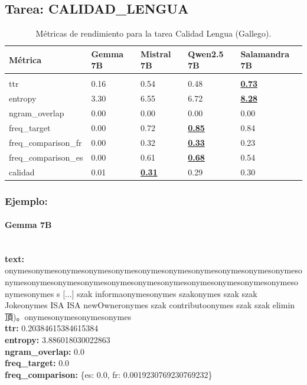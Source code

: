 \subsection{Tarea: CALIDAD\_LENGUA}\label{tarea-calidad_lengua}
\begin{longtable}[]{@{}lllll@{}}
\toprule\noalign{}
Métrica & Gemma 7B & Mistral 7B & Qwen2.5 7B & Salamandra 7B \\
\midrule\noalign{}
\endhead
\bottomrule\noalign{}
\caption{Métricas de rendimiento para la tarea Calidad Lengua (Gallego).}
\label{tab:metricas_calidad_lengua_Gallego}\\
\endlastfoot
ttr & 0.16 & 0.54 & 0.48 & \textbf{\underline{0.73}} \\
entropy & 3.30 & 6.55 & 6.72 & \textbf{\underline{8.28}} \\
ngram\_overlap & 0.00 & 0.00 & 0.00 & 0.00 \\
freq\_target & 0.00 & 0.72 & \textbf{\underline{0.85}} & 0.84 \\
freq\_comparison\_fr & 0.00 & 0.32 & \textbf{\underline{0.33}} & 0.23 \\
freq\_comparison\_es & 0.00 & 0.61 & \textbf{\underline{0.68}} & 0.54 \\
calidad & 0.01 & \textbf{\underline{0.31}} & 0.29 & 0.30 \\
\end{longtable}

\subsubsection{Ejemplo:}

\paragraph{Gemma 7B}~\\
\textbf{text:} onymesonymesonymesonymesonymesonymesonymesonymesonymesonymesonymesonymesonymesonymesonymesonymesonymesonymesonymesonymesonymesonymesonymesonymes s [...] szak informaonymesonymes szakonymes szak szak Jokeonymes ISA ISA newOwneronymes szak contributoonymes szak szak elimin 頂)。onymesonymesonymesonymes\\
\textbf{ttr:} 0.20384615384615384\\
\textbf{entropy:} 3.886018030022863\\
\textbf{ngram\_overlap:} 0.0\\
\textbf{freq\_target:} 0.0\\
\textbf{freq\_comparison:} \{\textquotesingle{}es\textquotesingle{}: 0.0, \textquotesingle{}fr\textquotesingle{}: 0.0019230769230769232\}

